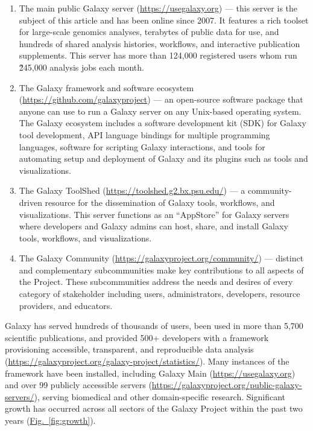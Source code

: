 \begin{enumerate}
\item The main public Galaxy server (\url{https://usegalaxy.org}) — this server is the subject of this article and has been online since 2007. It features a rich toolset for large-scale genomics analyses, terabytes of public data for use, and hundreds of shared analysis histories, workflows, and interactive publication supplements. This server has more than 124,000 registered users whom run \~245,000 analysis jobs each month.

\item The Galaxy framework and software ecosystem (\url{https://github.com/galaxyproject}) — an open-source software package that anyone can use to run a Galaxy server on any Unix-based operating system. The Galaxy ecosystem includes a software development kit (SDK) for Galaxy tool development, API language bindings for multiple programming languages, software for scripting Galaxy interactions, and tools for automating setup and deployment of Galaxy and its plugins such as tools and visualizations.

\item The Galaxy ToolShed (\url{https://toolshed.g2.bx.psu.edu/}) — a community-driven resource for the dissemination of Galaxy tools, workflows, and visualizations. This server functions as an “AppStore” for Galaxy servers where developers and Galaxy admins can host, share, and install Galaxy tools, workflows, and visualizations.

\item The Galaxy Community (\url{https://galaxyproject.org/community/}) — distinct and complementary subcommunities make key contributions to all aspects of the Project. These subcommunities address the needs and desires of every category of stakeholder including users, administrators, developers, resource providers, and educators.
\end{enumerate}

Galaxy has served hundreds of thousands of users, been used in more than 5,700 scientific publications, and provided 500+ developers with a framework provisioning accessible, transparent, and reproducible data analysis (\url{https://galaxyproject.org/galaxy-project/statistics/}). Many instances of the framework have been installed, including Galaxy Main (\url{https://usegalaxy.org}) and over 99 publicly accessible servers (\url{https://galaxyproject.org/public-galaxy-servers/}), serving biomedical and other domain-specific research. Significant growth has occurred across all sectors of the Galaxy Project within the past two years (\hyperref[fig:growth]{Fig.~\ref{fig:growth}}).


